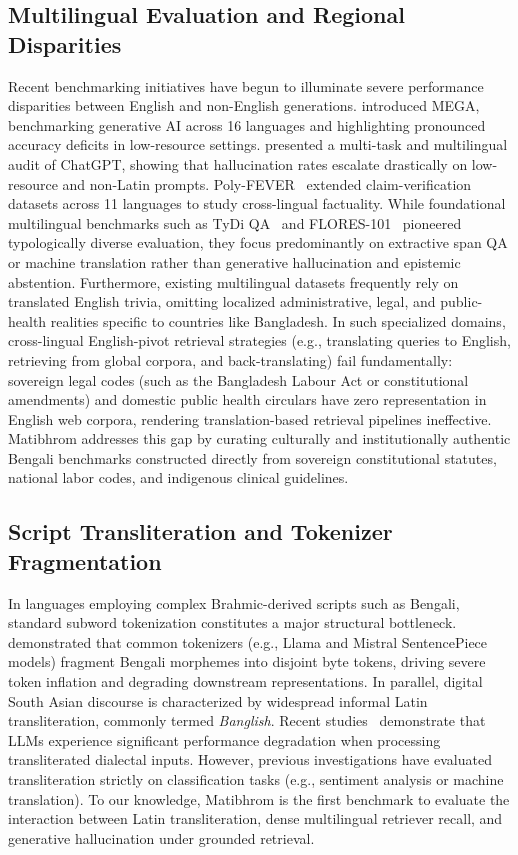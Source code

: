 \subsection{Multilingual Evaluation and Regional Disparities}
Recent benchmarking initiatives have begun to illuminate severe performance disparities between English and non-English generations. \citet{ahuja2023mega} introduced MEGA, benchmarking generative AI across 16 languages and highlighting pronounced accuracy deficits in low-resource settings. \citet{bang2023multitask} presented a multi-task and multilingual audit of ChatGPT, showing that hallucination rates escalate drastically on low-resource and non-Latin prompts. Poly-FEVER~\citep{zhu2024polyfever} extended claim-verification datasets across 11 languages to study cross-lingual factuality. While foundational multilingual benchmarks such as TyDi QA~\citep{clark2020tydi} and FLORES-101~\citep{goyal2022flores} pioneered typologically diverse evaluation, they focus predominantly on extractive span QA or machine translation rather than generative hallucination and epistemic abstention. Furthermore, existing multilingual datasets frequently rely on translated English trivia, omitting localized administrative, legal, and public-health realities specific to countries like Bangladesh. In such specialized domains, cross-lingual English-pivot retrieval strategies (e.g., translating queries to English, retrieving from global corpora, and back-translating) fail fundamentally: sovereign legal codes (such as the Bangladesh Labour Act or constitutional amendments) and domestic public health circulars have zero representation in English web corpora, rendering translation-based retrieval pipelines ineffective. Matibhrom addresses this gap by curating culturally and institutionally authentic Bengali benchmarks constructed directly from sovereign constitutional statutes, national labor codes, and indigenous clinical guidelines.

\subsection{Script Transliteration and Tokenizer Fragmentation}
In languages employing complex Brahmic-derived scripts such as Bengali, standard subword tokenization constitutes a major structural bottleneck. \citet{hasan2023banglatokenizer} demonstrated that common tokenizers (e.g., Llama and Mistral SentencePiece models) fragment Bengali morphemes into disjoint byte tokens, driving severe token inflation and degrading downstream representations. In parallel, digital South Asian discourse is characterized by widespread informal Latin transliteration, commonly termed \emph{Banglish}. Recent studies~\citep{saha2024robustness,chowdhury20245dialects} demonstrate that LLMs experience significant performance degradation when processing transliterated dialectal inputs. However, previous investigations have evaluated transliteration strictly on classification tasks (e.g., sentiment analysis or machine translation). To our knowledge, Matibhrom is the first benchmark to evaluate the interaction between Latin transliteration, dense multilingual retriever recall, and generative hallucination under grounded retrieval.


